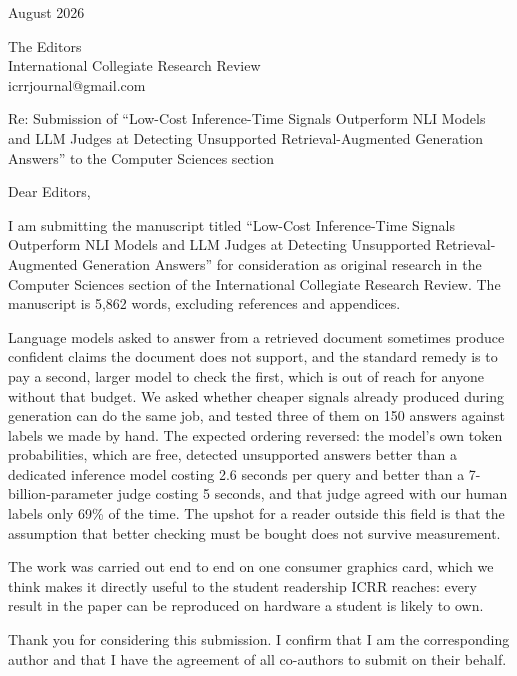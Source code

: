 \documentclass[11pt,a4paper]{article}
\begin{document}
 August 2026

\vspace{1em}
\noindent
The Editors\\
International Collegiate Research Review\\
icrrjournal@gmail.com

\vspace{1em}
\noindent
Re: Submission of ``Low-Cost Inference-Time Signals Outperform NLI Models and
LLM Judges at Detecting Unsupported Retrieval-Augmented Generation Answers'' to
the Computer Sciences section

\vspace{1em}
\noindent
Dear Editors,

\vspace{0.5em}

I am submitting the manuscript titled ``Low-Cost Inference-Time Signals
Outperform NLI Models and LLM Judges at Detecting Unsupported
Retrieval-Augmented Generation Answers'' for consideration as original research
in the Computer Sciences section of the International Collegiate Research Review.
The manuscript is 5{,}862 words, excluding references and appendices.

Language models asked to answer from a retrieved document sometimes produce
confident claims the document does not support, and the standard remedy is to
pay a second, larger model to check the first, which is out of reach for anyone
without that budget. We asked whether cheaper signals already produced during
generation can do the same job, and tested three of them on 150 answers against
labels we made by hand. The expected ordering reversed: the model's own token
probabilities, which are free, detected unsupported answers better than a
dedicated inference model costing 2.6 seconds per query and better than a
7-billion-parameter judge costing 5 seconds, and that judge agreed with our human
labels only 69\% of the time. The upshot for a reader outside this field is that
the assumption that better checking must be bought does not survive measurement.

The work was carried out end to end on one consumer graphics card, which we
think makes it directly useful to the student readership ICRR reaches: every
result in the paper can be reproduced on hardware a student is likely to own.

\vspace{0.5em}
\noindent
Thank you for considering this submission. I confirm that I am the corresponding
author and that I have the agreement of all co-authors to submit on their behalf.
\end{document}
